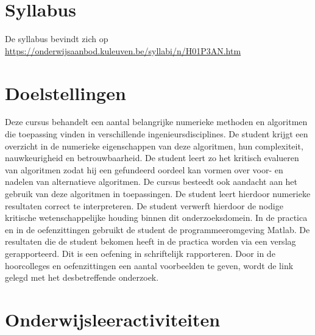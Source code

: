\section*{Syllabus}
De syllabus bevindt zich op \url{https://onderwijsaanbod.kuleuven.be/syllabi/n/H01P3AN.htm}

\section*{Doelstellingen}
Deze cursus behandelt een aantal belangrijke numerieke methoden en algoritmen die toepassing vinden in verschillende ingenieursdisciplines. De student krijgt een overzicht in de numerieke eigenschappen van deze algoritmen, hun complexiteit, nauwkeurigheid en betrouwbaarheid.
De student leert zo het kritisch evalueren van algoritmen zodat hij een gefundeerd oordeel kan vormen over voor- en nadelen van alternatieve algoritmen. De cursus besteedt ook aandacht aan het gebruik van deze algoritmen in toepassingen. De student leert hierdoor numerieke resultaten correct te interpreteren.
De student verwerft hierdoor de nodige kritische wetenschappelijke houding binnen dit onderzoeksdomein. In de practica en in de oefenzittingen gebruikt de student de programmeeromgeving Matlab. De resultaten die de student bekomen heeft in de practica worden via een verslag gerapporteerd. Dit is  een oefening in schriftelijk rapporteren. Door in de hoorcolleges en oefenzittingen een aantal voorbeelden te geven, wordt de link gelegd met het desbetreffende onderzoek.

\section*{Onderwijsleeractiviteiten}
